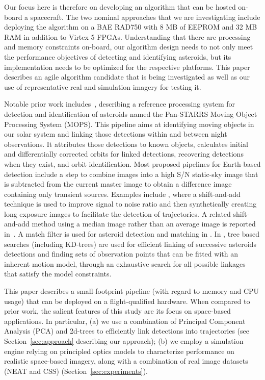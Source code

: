 \documentclass{article}
\begin{document}
Our focus here is therefore on developing an algorithm that can be hosted on-board a spacecraft. The two nominal approaches that we are investigating include deploying the algorithm on a BAE RAD750 with 8 MB of EEPROM and 32 MB RAM in addition to Virtex 5 FPGAs. Understanding that there are processing and memory constraints on-board, our algorithm design needs to not only meet the performance objectives of detecting and identifying asteroids, but its implementation needs to be optimized for the respective platforms. This paper describes an agile algorithm candidate that is being investigated as well as our use of representative real and simulation imagery for testing it.

Notable prior work includes~\cite{denneau2013pan}, describing a reference processing system for detection and identification of asteroids named the Pan-STARRS Moving Object Processing System (MOPS). This pipeline aims at identifying moving objects in our solar system and linking those detections within and between night observations. It attributes those detections to known objects, calculates initial and differentially corrected orbits for linked detections, recovering detections when they exist, and orbit identification. Most proposed pipelines for Earth-based detection include a step to combine images into	 a high S/N static-sky image that is subtracted from the current master image to obtain a difference image containing only transient sources. Examples include \cite{shao2014finding}, where a shift-and-add technique is used to improve  signal to noise ratio and then synthetically creating long exposure images to facilitate the detection of trajectories. A related shift-and-add method using a median  image rather than an average image is reported in~\cite{yanagisawa2005automatic}. A match filter is used for asteroid detection and matching in \cite{gural2005matched}. In \cite{kubica2005variable,kubica2005multiple,kubica2007efficient}, tree based searches (including KD-trees) are used for efficient linking of successive asteroids detections and finding sets of observation points that can be fitted with an inherent motion model, through an exhaustive search for all possible linkages that satisfy the model constraints.
	
	This paper describes a small-footprint pipeline (with regard to memory and CPU usage) that can be deployed on a flight-qualified hardware. When compared to prior work, the salient features of this study are its focus on space-based applications. In particular, (a) we use a combination of Principal Component Analysis (PCA) and 2d-trees to efficiently link detections into trajectories (see Section~\ref{sec:approach} describing our approach); (b) we employ a simulation engine relying on principled optics models to characterize  performance on realistic space-based imagery, along with a combination of real image datasets (NEAT and CSS) (Section~\ref{sec:experiments}).
		
\end{document}

